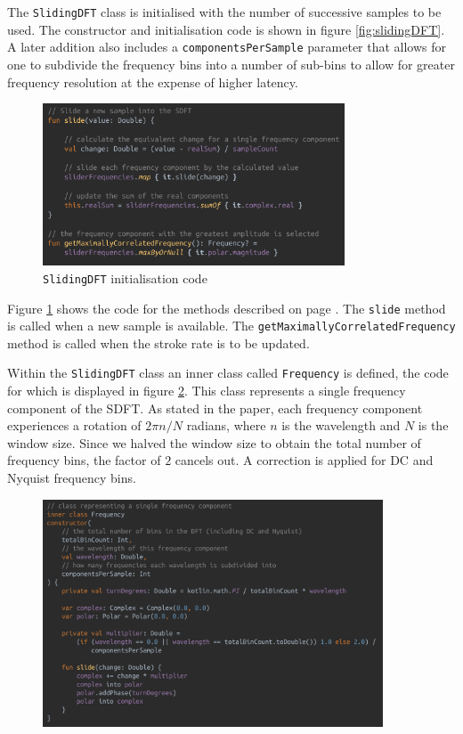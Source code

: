 \documentclass[11pt,twoside,a4paper]{report}
\begin{document}
The \texttt{SlidingDFT} class is initialised with the number of successive samples to be used. The constructor and initialisation code is shown in figure \ref{fig:slidingDFT}. A later addition also includes a \texttt{componentsPerSample} parameter that allows for one to subdivide the frequency bins into a number of sub-bins to allow for greater frequency resolution at the expense of higher latency.

\begin{figure}[h!]
  \centering
  \includegraphics[width=0.8\textwidth]{code-SDFT-slide.png}
  \caption{\texttt{SlidingDFT} initialisation code}
  \label{fig:slideBest}
\end{figure}

Figure \ref{fig:slideBest} shows the code for the methods described on page \pageref{par:slideFreqBin}. The \texttt{slide} method is called when a new sample is available. The \texttt{getMaximallyCorrelatedFrequency} method is called when the stroke rate is to be updated.

Within the \texttt{SlidingDFT} class an inner class called \texttt{Frequency} is defined, the code for which is displayed in figure \ref{fig:innerClassFrequency}. This class represents a single frequency component of the SDFT. As stated in the paper, each frequency component experiences a rotation of $2\pi n / N$ radians, where $n$ is the wavelength and $N$ is the window size. Since we halved the window size to obtain the total number of frequency bins, the factor of $2$ cancels out. A correction is applied for DC and Nyquist frequency bins.

\begin{figure}[h!]
  \centering
  \includegraphics[width=0.9\textwidth]{code-innerClassFrequency.png}
  \caption{}
  \label{fig:innerClassFrequency}
\end{figure}
\end{document}
